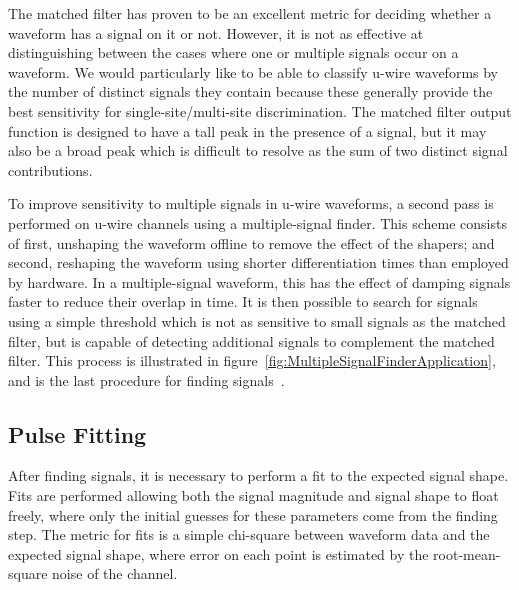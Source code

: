 The matched filter has proven to be an excellent metric for deciding whether a waveform has a signal on it or not.  However, it is not as effective at distinguishing between the cases where one or multiple signals occur on a waveform.  We would particularly like to be able to classify u-wire waveforms by the number of distinct signals they contain because these generally provide the best sensitivity for single-site/multi-site discrimination.  The matched filter output function is designed to have a tall peak in the presence of a signal, but it may also be a broad peak which is difficult to resolve as the sum of two distinct signal contributions.

To improve sensitivity to multiple signals in u-wire waveforms, a second pass is performed on u-wire channels using a multiple-signal finder.  This scheme consists of first, unshaping the waveform offline to remove the effect of the shapers; and second, reshaping the waveform using shorter differentiation times than employed by hardware.  In a multiple-signal waveform, this has the effect of damping signals faster to reduce their overlap in time.  It is then possible to search for signals using a simple threshold which is not as sensitive to small signals as the matched filter, but is capable of detecting additional signals to complement the matched filter.  This process is illustrated in figure~\ref{fig:MultipleSignalFinderApplication}, and is the last procedure for finding signals~\cite{ReconstructionDocument}.

\subsection{Pulse Fitting}\label{sec:ReconPulseFitting}

After finding signals, it is necessary to perform a fit to the expected signal shape.  Fits are performed allowing both the signal magnitude and signal shape to float freely, where only the initial guesses for these parameters come from the finding step.  The metric for fits is a simple chi-square between waveform data and the expected signal shape, where error on each point is estimated by the root-mean-square noise of the channel.

